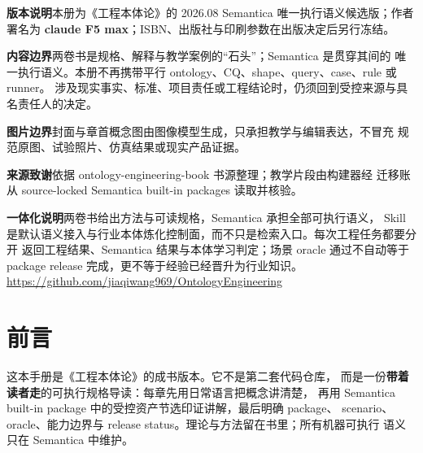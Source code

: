 \documentclass[a4paper]{ctexbook}
\begin{document}
\ifdefined\CoverOnly
\else

\clearpage
\thispagestyle{empty}
\vspace*{0.56\textheight}
\begin{minipage}{0.88\textwidth}
\small\color{black!68}
\textbf{版本说明}\quad 本册为《工程本体论》的 2026.08 Semantica 唯一执行语义候选版；作者署名为
\textbf{claude F5 max}；ISBN、出版社与印刷参数在出版决定后另行冻结。\par\medskip

\textbf{内容边界}\quad 两卷书是规格、解释与教学案例的“石头”；Semantica 是贯穿其间的
唯一执行语义。本册不再携带平行 ontology、CQ、shape、query、case、rule 或 runner。
涉及现实事实、标准、项目责任或工程结论时，仍须回到受控来源与具名责任人的决定。\par\medskip

\textbf{图片边界}\quad 封面与章首概念图由图像模型生成，只承担教学与编辑表达，不冒充
规范原图、试验照片、仿真结果或现实产品证据。\par\medskip

\textbf{来源致谢}\quad 依据 ontology-engineering-book 书源整理；教学片段由构建器经
迁移账从 source-locked Semantica built-in packages 读取并核验。\par\medskip

\textbf{一体化说明}\quad 两卷书给出方法与可读规格，Semantica 承担全部可执行语义，
Skill 是默认语义接入与行业本体炼化控制面，而不只是检索入口。每次工程任务都要分开
返回工程结果、Semantica 结果与本体学习判定；场景 oracle 通过不自动等于 package
release 完成，更不等于经验已经晋升为行业知识。
\url{https://github.com/jiaqiwang969/OntologyEngineering}
\end{minipage}
\clearpage

\tableofcontents

\chapter{前言}

这本手册是《工程本体论》的成书版本。它不是第二套代码仓库，
而是一份\textbf{带着读者走}的可执行规格导读：每章先用日常语言把概念讲清楚，
再用 Semantica built-in package 中的受控资产节选印证讲解，最后明确 package、
scenario、oracle、能力边界与 release status。理论与方法留在书里；所有机器可执行
语义只在 Semantica 中维护。
\end{document}
